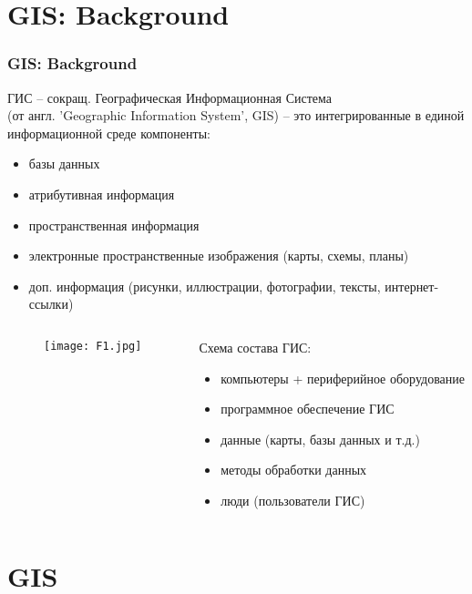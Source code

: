 \documentclass[pdflatex,compress,8pt,
	xcolor={dvipsnames,dvipsnames,svgnames,x11names,table},
	hyperref={	 
	pdfauthor={Lemenkova Polina}, 
	pdfsubject={Preentation}, 
	pdfcreator={Lemenkova Polina}, 
	pdfproducer={Lemenkova Polina}, 
	colorlinks=true,
	linkcolor=Red3, 
	citecolor=NavyBlue, 
	urlcolor = NavyBlue, 
	breaklinks = true}]{beamer}
\begin{document}
\section{GIS: Background}
\begin{frame}\frametitle{GIS: Background}
ГИС – сокращ. Географическая Информационная Система \\
(от англ. 'Geographic Information System', GIS)  –  это интегрированные в единой информационной среде компоненты:
\begin{itemize}
	\item базы данных
	\item атрибутивная информация
	\item пространственная информация
	\item электронные пространственные изображения (карты, схемы, планы) 
	\item доп. информация (рисунки, иллюстрации, фотографии, тексты, интернет-ссылки)
\end{itemize}

\begin{minipage}[0.4\textheight]{\textwidth}
		\begin{columns}[T]
			\begin{column}{0.5\textwidth}
				\begin{figure}[H]
					\centering
					\texttt{[image: F1.jpg]}
				\end{figure}
			\end{column}
			\begin{column}{0.5\textwidth}
\vspace{2em}
Схема состава ГИС:
\begin{itemize}
	\item компьютеры + периферийное оборудование
	\item программное обеспечение ГИС
	\item данные (карты, базы данных и т.д.)
	\item методы обработки данных
	\item люди (пользователи ГИС)
\end{itemize}
			\end{column}
		\end{columns}
\end{minipage}

\end{frame}

\section{GIS}
\end{document}

